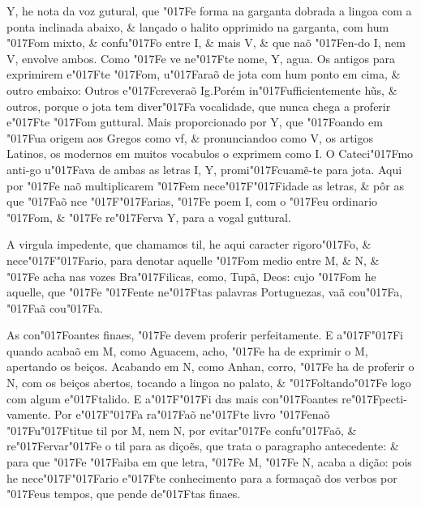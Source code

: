 \documentclass[openany,titlepage,12pt]{book}
\newcommand{\lgS}{\char"017F}
\newcommand{\lgSS}{\char"017F\char"017F}
\begin{document}
Y, he nota da voz gutural, que \lgS e forma na garganta dobrada a
lingoa com a ponta inclinada abaixo, \& lançado o halito opprimido
na garganta, com hum \lgS om mixto, \& confu\lgS o entre I, \& mais
V, \& que naõ \lgS en-do I, nem V, envolve ambos. Como \lgS e ve 
ne\lgS te nome, Y, agua. Os antigos para exprimirem e\lgS te \lgS om,
u\lgS araõ de jota com hum ponto em cima, \& outro embaixo: Outros
e\lgS creveraõ Ig.Porém in\lgS ufficientemente hũs, \& outros, porque
o jota tem diver\lgS a vocalidade, que nunca chega a proferir 
e\lgS te \lgS om guttural. Mais proporcionado por Y, que \lgS oando
em \lgS ua origem aos Gregos como vf, \& pronunciandoo como V,
os artigos Latinos, os modernos em muitos vocabulos o exprimem como
I. O Cateci\lgS mo anti-go u\lgS ava de ambas as letras I, Y, 
promi\lgS cuamẽ-te para jota. Aqui por \lgS e naõ multiplicarem
\lgS em nece\lgSS idade as letras, \& pôr as que \lgS aõ 
nce \lgSS arias, \lgS e poem I, com o \lgS eu ordinario 
\lgS om, \& \lgS e re\lgS erva Y, para a vogal guttural.

A virgula impedente, que chamamos til, he aqui caracter rigoro\lgS o,
\& nece\lgSS ario, para denotar aquelle \lgS om medio entre M, \& N,
\& \lgS e acha nas vozes Bra\lgS ilicas, como, Tupã, Deos: cujo
\lgS om he aquelle, que \lgS e \lgS ente ne\lgS tas palavras 
Portuguezas, vaã cou\lgS a, \lgS aã cou\lgS a.

As con\lgS oantes finaes, \lgS e devem proferir perfeitamente. E 
a\lgSS i quando acabaõ em M, como Aguacem, acho, \lgS e ha de 
exprimir o M, apertando os beiços. Acabando em N, como Anhan, corro,
\lgS e ha de proferir o N, com os beiços abertos, tocando a lingoa
no palato, \& \lgS oltando\lgS e logo com algum e\lgS talido. E
a\lgSS i das mais con\lgS oantes re\lgS pecti-vamente. Por e\lgSS a
ra\lgS aõ ne\lgS te livro \lgS enaõ\linebreak
\lgS u\lgS titue til por M, nem N,
por evitar\lgS e confu\lgS aõ, \& re\lgS ervar\lgS e o til para as
diçoẽs, que trata o paragrapho antecedente: \& para\linebreak
que \lgS e \lgS aiba em que letra,
\lgS e M, \lgS e N, acaba a dição: pois he
nece\lgSS ario e\lgS te conhecimento para
a formaçaõ dos verbos por \lgS eus tempos,
 que pende de\lgS tas finaes.
\end{document}
